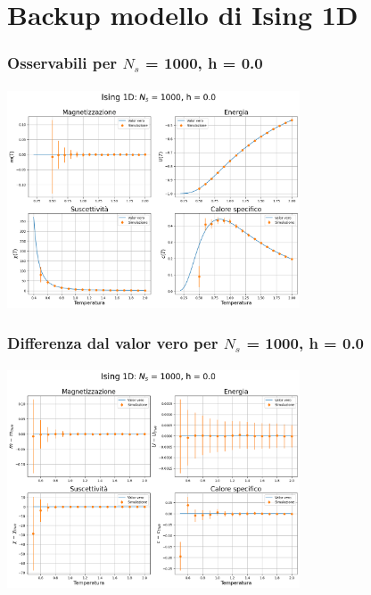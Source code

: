 \section{Backup modello di Ising 1D}

\begin{frame}
    \frametitle{Osservabili per $N_s$ = 1000, h = 0.0}
    \framesubtitle{}

    \centering
    \includegraphics[width=0.65\textwidth]{Immagini/backupIsing1D/obs_1000_0.0.png}

\end{frame}



\begin{frame}
    \frametitle{Differenza dal valor vero per $N_s$ = 1000, h = 0.0}
    \framesubtitle{}

    \centering
    \includegraphics[width=0.65\textwidth]{Immagini/backupIsing1D/obs_1000_0.0_diff.png}

\end{frame}




